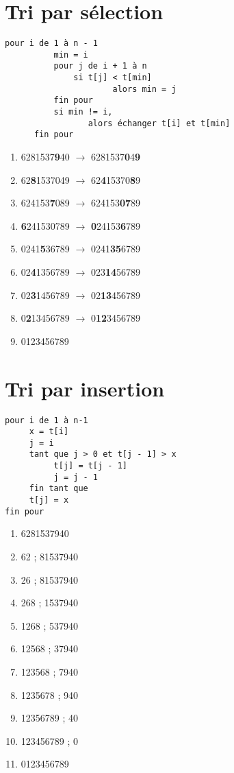 \documentclass[paper=a4, fontsize=9pt]{scrartcl} %
\begin{document}
\begin{multicols}{2}
  \section{Tri par sélection}

\begin{verbatim}
pour i de 1 à n - 1
          min = i
          pour j de i + 1 à n
              si t[j] < t[min]
                      alors min = j
          fin pour
          si min != i, 
                 alors échanger t[i] et t[min]
      fin pour
\end{verbatim}

\begin{enumerate}
\item 6281537\textbf{9}40 $\to$ 6281537\textbf{0}4\textbf{9} 
\item 62\textbf{8}1537049 $\to$ 62\textbf{4}15370\textbf{8}9
\item 624153\textbf{7}089 $\to$ 624153\textbf{07}89
\item \textbf{6}241530789 $\to$ \textbf{0}24153\textbf{6}789
\item 0241\textbf{5}36789 $\to$ 0241\textbf{35}6789
\item 02\textbf{4}1356789 $\to$ 023\textbf{14}56789
\item 02\textbf{3}1456789 $\to$ 02\textbf{13}456789
\item 0\textbf{2}13456789 $\to$ 0\textbf{12}3456789
\item 0123456789
\end{enumerate}

\section{Tri par insertion}

\begin{verbatim}
pour i de 1 à n-1
     x = t[i]
     j = i
     tant que j > 0 et t[j - 1] > x
          t[j] = t[j - 1]
          j = j - 1
     fin tant que
     t[j] = x
fin pour
\end{verbatim}

\begin{enumerate}
\item 6281537940
\item 62 ; 81537940  
\item 26 ; 81537940
\item 268 ; 1537940
\item 1268 ; 537940
\item 12568 ; 37940
\item 123568 ; 7940
\item 1235678 ; 940
\item 12356789 ; 40
\item 123456789 ; 0
\item 0123456789
\end{enumerate}


\end{multicols}
\end{document}

